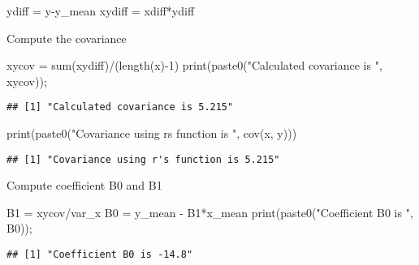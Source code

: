 \documentclass[
]{article}
\newenvironment{Shaded}{\begin{snugshade}}{\end{snugshade}}
\newcommand{\DecValTok}[1]{\textcolor[rgb]{0.00,0.00,0.81}{#1}}
\newcommand{\FunctionTok}[1]{\textcolor[rgb]{0.00,0.00,0.00}{#1}}
\newcommand{\NormalTok}[1]{#1}
\newcommand{\OtherTok}[1]{\textcolor[rgb]{0.56,0.35,0.01}{#1}}
\newcommand{\SpecialCharTok}[1]{\textcolor[rgb]{0.00,0.00,0.00}{#1}}
\newcommand{\StringTok}[1]{\textcolor[rgb]{0.31,0.60,0.02}{#1}}
\begin{document}
\begin{Shaded}
\begin{Highlighting}[]
\NormalTok{ydiff }\OtherTok{=}\NormalTok{ y}\SpecialCharTok{{-}}\NormalTok{y\_mean}
\NormalTok{xydiff }\OtherTok{=}\NormalTok{ xdiff}\SpecialCharTok{*}\NormalTok{ydiff}
\end{Highlighting}
\end{Shaded}

Compute the covariance

\begin{Shaded}
\begin{Highlighting}[]
\NormalTok{xycov }\OtherTok{=} \FunctionTok{sum}\NormalTok{(xydiff)}\SpecialCharTok{/}\NormalTok{(}\FunctionTok{length}\NormalTok{(x)}\SpecialCharTok{{-}}\DecValTok{1}\NormalTok{)}
\FunctionTok{print}\NormalTok{(}\FunctionTok{paste0}\NormalTok{(}\StringTok{"Calculated covariance is "}\NormalTok{, xycov));}
\end{Highlighting}
\end{Shaded}

\begin{verbatim}
## [1] "Calculated covariance is 5.215"
\end{verbatim}

\begin{Shaded}
\begin{Highlighting}[]
\FunctionTok{print}\NormalTok{(}\FunctionTok{paste0}\NormalTok{(}\StringTok{"Covariance using r\textquotesingle{}s function is "}\NormalTok{, }\FunctionTok{cov}\NormalTok{(x, y)))}
\end{Highlighting}
\end{Shaded}

\begin{verbatim}
## [1] "Covariance using r's function is 5.215"
\end{verbatim}

Compute coefficient B0 and B1

\begin{Shaded}
\begin{Highlighting}[]
\NormalTok{B1 }\OtherTok{=}\NormalTok{ xycov}\SpecialCharTok{/}\NormalTok{var\_x}
\NormalTok{B0 }\OtherTok{=}\NormalTok{ y\_mean }\SpecialCharTok{{-}}\NormalTok{ B1}\SpecialCharTok{*}\NormalTok{x\_mean}
\FunctionTok{print}\NormalTok{(}\FunctionTok{paste0}\NormalTok{(}\StringTok{"Coefficient B0 is "}\NormalTok{, B0));}
\end{Highlighting}
\end{Shaded}

\begin{verbatim}
## [1] "Coefficient B0 is -14.8"
\end{verbatim}
\end{document}
